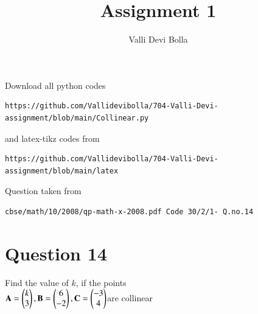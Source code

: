 \documentclass[journal,12pt,twocolumn]{IEEEtran}
\begin{document}
\title{Assignment 1}
\author{Valli Devi Bolla}
\maketitle
\newpage
\bigskip
\renewcommand{\thefigure}{\theenumi}
\renewcommand{\thetable}{\theenumi}
Download all python codes
\begin{lstlisting}
https://github.com/Vallidevibolla/704-Valli-Devi-assignment/blob/main/Collinear.py
\end{lstlisting}
%
and latex-tikz codes from
\begin{lstlisting}
https://github.com/Vallidevibolla/704-Valli-Devi-assignment/blob/main/latex
\end{lstlisting}
%
Question taken from
\begin{lstlisting}
cbse/math/10/2008/qp-math-x-2008.pdf Code 30/2/1- Q.no.14 
\end{lstlisting}
%
\section{Question 14}
Find the value of $k$, if the points\\ 
$\mathbf {A}=\begin{pmatrix}k\\3\end{pmatrix},
\mathbf {B}=\begin{pmatrix}6\\-2\end{pmatrix},
\mathbf {C}=\begin{pmatrix}-3\\4\end{pmatrix}$are collinear
\end{document}
